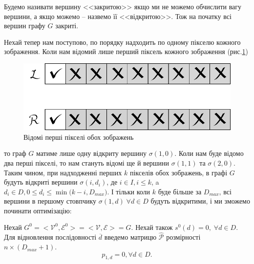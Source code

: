 \documentclass{ConfFTI}
\begin{document}
\label {2.1-style} Будемо називати вершину <<закритою>> якщо ми не можемо обчислити вагу вершини, а якщо можемо -- назвемо її <<відкритою>>. 
Тож на початку всі вершин графу $G$ закриті.

Нехай тепер нам поступово, по порядку надходить по одному пікселю кожного зображення. Коли нам відомий лише перший піксель кожного зображення (рис.\ref{2.2onedata})
\begin{figure}[h]
	\centering
	\includegraphics[scale = 0.5]{onestereoknown.pdf}
	\caption{Відомі перші пікселі обох зображень}
	\label{2.2onedata}
\end{figure}
то граф $G$ матиме лише одну відкриту вершину $\sigma(1, 0)$. Коли нам буде відомо два перші пікселі, то нам стануть відомі ще й вершини 
$\sigma(1, 1)$ та $\sigma(2, 0)$. Таким чином, при надходженні перших $k$ пікселів обох зображень, в графі $G$ будуть відкриті вершини 
$\sigma(i, d_i)$, де $i \in I, i \leq k$, a $d_i \in D, 0 \leq d_i \leq \min{\big( k - i, D_{max}  \big)}$. І тільки коли $k$ буде більше за $D_{max}$, всі вершини в першому стовпчику $\sigma(1, d) \; \forall d \in D $ будуть відкритими, і ми зможемо починати оптимізацію:

Нехай $G^0 = <\mathcal{V}^0, \mathcal{E}^0> = <\mathcal{V}, \mathcal{E}> = G $. Нехай також $s^0(d) = 0, \; \forall d \in D $. Для відновлення послідовності 
$\overline{d}$ введемо матрицю $\hat{\mathcal{P}}$ розмірності $n \times (D_{max} + 1)$.  $$p_{1,d} = 0, \forall d \in D. $$
\end{document}
